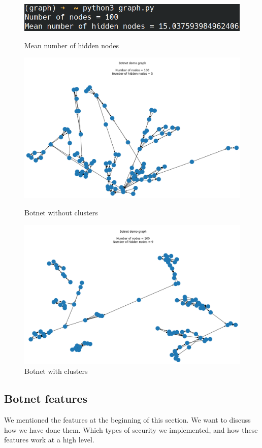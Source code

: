 \documentclass[11pt, a4paper,twoside]{tesi_upf}
\begin{document}
\begin{figure}
\centering
\includegraphics[width=\linewidth]{images/hidden-nodes-median.png}
    \caption{Mean number of hidden nodes}
\includegraphics[width=\linewidth]{images/demo-graph-2.png}
    \caption{Botnet without clusters}
\includegraphics[width=\linewidth]{images/demo-graph.png}
    \caption{Botnet with clusters}
\end{figure}

\subsection{Botnet features}

We mentioned the features at the beginning of this section. We want to discuss how we have done them. Which types of security we implemented, and how these features work at a high level.
\end{document}
